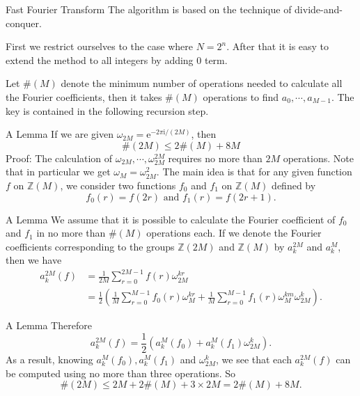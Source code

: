 \documentclass{beamer}
\begin{document}
\begin{frame}{Fast Fourier Transform}
    The algorithm is based on the technique of divide-and-conquer.

    \pause

    First we restrict ourselves to the case where $N = 2^n$. After that it is easy to extend the method to all integers by adding $0$ term.

    \pause

    Let $\#(M)$ denote the minimum number of operations needed to calculate all the Fourier coefficients, then it takes $\#(M)$ operations to find $a_0, \cdots, a_{M - 1}$. The key is contained in the following recursion step.
\end{frame}

\begin{frame}{A Lemma}
    If we are given $\omega_{2M} = \text{e}^{-2 \pi \text{i} / (2M)}$, then
    $$
    \#(2M) \le 2\#(M) + 8M
    $$
    \pause
    Proof: The calculation of $\omega_{2M}, \cdots, \omega_{2M}^{2M}$ requires no more than $2M$ operations. Note that in particular we get $\omega_M = \omega_{2M}^2$. 
    The main idea is that for any given function $f$ on $\mathbb Z(M)$, we consider two functions $f_0$ and $f_1$ on $\mathbb Z(M)$ defined by
    $$
    f_0(r) = f(2r) \text{ and } f_1(r) = f(2r + 1).
    $$
\end{frame}

\begin{frame}{A Lemma}
    We assume that it is possible to calculate the Fourier coefficient of $f_0$ and $f_1$ in no more than $\#(M)$ operations each. If we denote the Fourier coefficients corresponding to 
    the groups $\mathbb Z(2M)$ and $\mathbb Z(M)$ by $a_{k}^{2M}$ and $a_{k}^M$, then we have
    $$
    \begin{aligned}
        a_k^{2M}(f) &= \frac{1}{2M} \sum_{r = 0}^{2M - 1} f(r) \omega_{2M}^{kr} \\
        &= \frac{1}{2}\left(\frac{1}{M}\sum_{r = 0}^{M - 1}f_0(r) \omega_M^{kr} + \frac{1}{M}\sum_{r = 0}^{M - 1} f_1(r) \omega_M^{km} \omega_{2M}^k\right).
    \end{aligned}
    $$
\end{frame}

\begin{frame}{A Lemma}
    Therefore
    $$
    a_k^{2M}(f) = \frac{1}{2} \left(a_k^M(f_0) + a_k^M(f_1) \omega_{2M}^k \right).
    $$
    As a result, knowing $a_k^M(f_0), a_k^M(f_1)$ and $\omega_{2M}^k$, we see that each $a_k^{2M}(f)$ can be computed using no more than three operations. So
    $$
    \#(2M) \le 2M + 2 \#(M) + 3 \times 2M = 2 \#(M) + 8M.
    $$
\end{frame}
\end{document}
